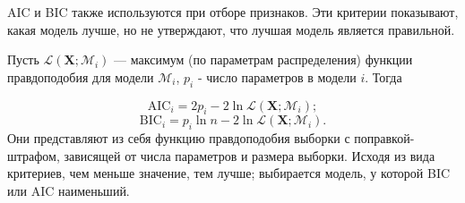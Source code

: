 \documentclass[12pt]{article}
\newcommand{\X}{\bm{X}}
\begin{document}
			
			AIC и BIC также используются при отборе признаков. Эти критерии показывают, какая модель лучше, но не утверждают, что лучшая модель является правильной.
			
			Пусть $\mathcal L(\X; \mathcal M_i)$ --- максимум (по параметрам распределения) функции правдоподобия для модели $\mathcal M_i$, $p_i$ - число параметров в модели $i$. Тогда
			
			$$
			\mathrm{AIC}_i = 2p_i - 2\ln{\mathcal L(\X; \mathcal M_i)};
			$$
			$$
			\mathrm{BIC}_i = p_i\ln{n} - 2\ln{\mathcal L(\X; \mathcal M_i)}.
			$$
			Они представляют из себя функцию правдоподобия выборки с поправкой-штрафом, зависящей от числа параметров и размера выборки. Исходя из вида критериев, чем меньше значение, тем лучше; выбирается модель, у которой BIC или AIC наименьший.
			
	
	
		
\end{document}
